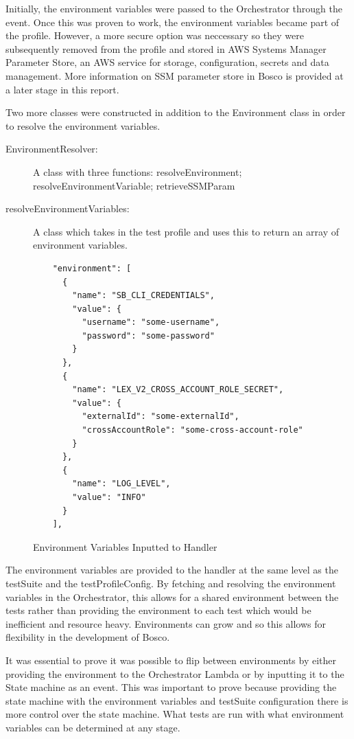 \documentclass[12pt,a4paper,titlepage]{report}
\begin{document}
Initially, the environment variables were passed to the Orchestrator through the event. Once this was proven to work, the environment variables became part of the profile. However, a more 
secure option was neccessary so they were subsequently removed from the profile and stored in AWS Systems Manager Parameter Store, an AWS service for storage, configuration, secrets and data management. 
More information on SSM parameter store in Bosco is provided at a later stage in this report.

Two more classes were constructed in addition to the Environment class in order to resolve the environment variables. 
\begin{description}
  \item[EnvironmentResolver:]A class with three functions: resolveEnvironment; resolveEnvironmentVariable; retrieveSSMParam
  \item[resolveEnvironmentVariables:]A class which takes in the test profile and uses this to return an array of environment variables.
\end{description}

\begin{figure}[H]
  \begin{tcolorbox}
   \begin{verbatim}
    "environment": [
      {
        "name": "SB_CLI_CREDENTIALS",
        "value": {
          "username": "some-username",
          "password": "some-password"
        }
      },
      {
        "name": "LEX_V2_CROSS_ACCOUNT_ROLE_SECRET",
        "value": {
          "externalId": "some-externalId",
          "crossAccountRole": "some-cross-account-role"
        }
      },
      {
        "name": "LOG_LEVEL",
        "value": "INFO"
      }
    ],
 \end{verbatim}
  \end{tcolorbox}
  \caption{Environment Variables Inputted to Handler}
 \end{figure}

The environment variables are provided to the handler at the same level as the testSuite and the testProfileConfig. 
By fetching and resolving the environment variables in the Orchestrator, this allows for a shared environment between the tests rather 
than providing the environment to each test which would be inefficient and resource heavy. Environments can grow and so this allows 
for flexibility in the development of Bosco.

It was essential to prove it was possible to flip between environments by either providing the environment to the
Orchestrator Lambda or by inputting it to the State machine as an event. 
This was important to prove because providing the state machine with the environment variables and testSuite configuration there is more control over the state
machine. What tests are run with what environment variables can be determined at any stage.
\end{document}
